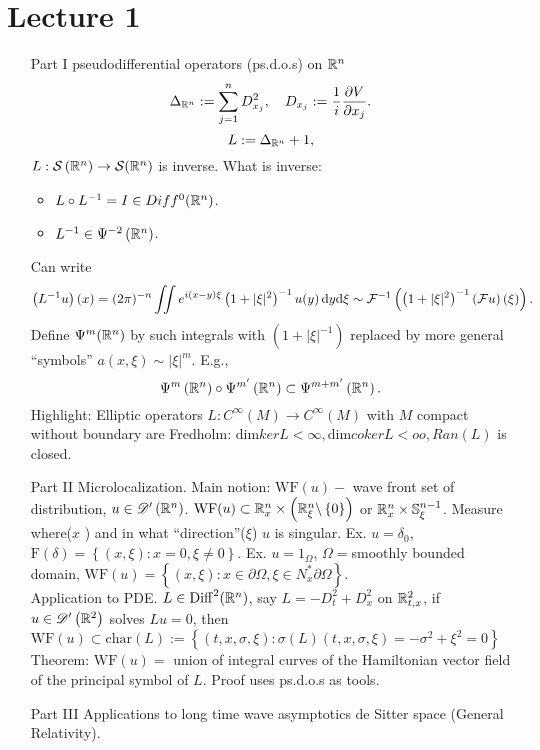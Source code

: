 \tableofcontents
\section{Lecture 1}
\begin{enumerate}
	\item [Part I] pseudodifferential operators (ps.d.o.s) on $\mathbb{R}^{n}$ 
		 \[
		 \Delta_{\mathbb{R}^{n}}:= \sum_{j=1}^{n} D_{x_j}^2,\quad D_{x_j}:= \frac{1}{i}\frac{\partial V}{\partial x_j}. 
		 \] 
		 \[
		 L:=\Delta_{\mathbb{R}^{n}}+1,
		 \] 
		 $L:\mathcal{S}\left( \mathbb{R}^{n} \right) \to \mathcal{S}(\mathbb{R}^{n})$ is inverse. What is inverse:
		 \begin{itemize}
		 	\item $L\circ L^{-1}=I \in Diff^{0}(\mathbb{R}^{n})$.
			\item $L^{-1}\in \Psi^{-2}\left( \mathbb{R}^{n} \right) $.
		 \end{itemize}
		 Can write
		 \[
			 \left( L^{-1}u \right) (x)=(2\pi)^{-n}\iint e^{i(x-y) \xi} \left( 1+|\xi |^{2} \right) ^{-1}u(y)\,\mathrm{d} y \mathrm{d}\xi\sim \mathcal{F}^{-1}\left( \left( 1+|\xi |^2 \right) ^{-1}\left( \mathcal{F}u \right) (\xi ) \right).  
		 \] 
	 Define $\Psi ^{m}(\mathbb{R}^{n})$ by such integrals with $\left( 1+|\xi |^{-1} \right) $ replaced by more general ``symbols'' $a(x,\xi )\sim |\xi|^{m}$. E.g.,
	 \[
	 \Psi^{m}\left( \mathbb{R}^{n} \right) \circ \Psi^{m'}\left( \mathbb{R}^{n} \right) \subset \Psi^{m+m'}\left( \mathbb{R}^{n} \right). 
	 \]
	 Highlight: Elliptic operators $L:C^{\infty}(M)\to C^{\infty}(M)$ with $M$ compact without boundary are Fredholm: $\mathrm{dim}ker L<\infty,\mathrm{dim}coker L<oo,Ran(L) $ is closed.
 \item [Part II] Microlocalization. Main notion: $\mathrm{WF}(u)-$ wave front set of distribution, $u \in \mathscr{D}'\left( \mathbb{R}^{n} \right) $. $\mathrm{WF}(u) \subset \mathbb{R}^{n}_x \times \left( \mathbb{R}^{n}_{\xi }\backslash \left\{0\right\}  \right) $ or $\mathbb{R}^{n}_x\times \mathbb{S}_\xi ^{n-1}$. Measure where($x$ ) and in what ``direction''($\xi $) $u$ is singular. Ex. $u=\delta_0$, $\mathrm{F}(\delta)=\left\{(x,\xi ):x=0,\xi \neq 0\right\} $. Ex. $u=1_{\Omega}$, $\Omega=$smoothly bounded domain, $\mathrm{WF}(u)=\left\{(x,\xi ):x \in \partial\Omega, \xi \in N_x^{*}\partial \Omega\right\} $. \\
	 Application to PDE. $L\in \mathrm{Diff}^2(\mathbb{R}^{n})$, say $L=-D_{t}^2+D_x^2$ on $\mathbb{R}^2_{t,x}$, if $u\in \mathscr{D}'\left( \mathbb{R}^2 \right) $ solves $Lu=0$, then $\mathrm{WF}(u)\subset \mathrm{char}(L):=\left\{(t,x,\sigma ,\xi ):\sigma (L)(t,x,\sigma ,\xi )=-\sigma ^2+\xi ^2=0\right\} $ \\
	 Theorem: $\mathrm{WF}(u)=$ union of integral curves of the Hamiltonian vector field of the principal symbol of $L$. Proof uses ps.d.o.s as tools.
 \item [Part III] Applications to long time wave asymptotics de Sitter space (General Relativity).
\end{enumerate}

